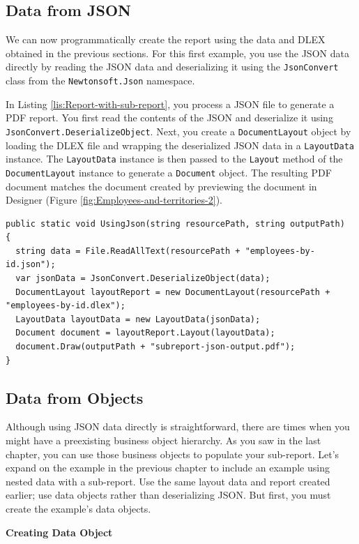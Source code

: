 \documentclass[american,letterpaper]{tufte-book}
\numberwithin{equation}{section}
\numberwithin{figure}{section}
\begin{document}
{{\begin{figure}
\end{figure}


\subsection{Data from JSON}

We can now programmatically create
the report using the data and DLEX obtained in the previous sections. For this first example, you use the JSON
data directly by reading the JSON data and deserializing it using
the \texttt{JsonConvert} class from the \texttt{Newtonsoft.Json} namespace.\cite{newtonsoft}

In Listing \ref{lis:Report-with-sub-report}, you process a JSON file
to generate a PDF report. You first read the contents of the JSON
and deserialize it using \texttt{JsonConvert.DeserializeObject}. Next,
you create a \texttt{DocumentLayout} object by loading the DLEX file
and wrapping the deserialized JSON data in a \texttt{LayoutData} instance.
The \texttt{LayoutData} instance is then passed to the \texttt{Layout}
method of the \texttt{DocumentLayout} instance to generate a \texttt{Document}
object. The resulting PDF document matches the document created by
previewing the document in Designer (Figure \ref{fig:Employees-and-territories-2}).

\bgroup{}
\begin{lstlisting}[caption={Report with sub-report using JSON.},label={lis:Report-with-sub-report},basicstyle={\small\ttfamily},breaklines=true]
public static void UsingJson(string resourcePath, string outputPath)
{
  string data = File.ReadAllText(resourcePath + "employees-by-id.json");
  var jsonData = JsonConvert.DeserializeObject(data);
  DocumentLayout layoutReport = new DocumentLayout(resourcePath + "employees-by-id.dlex");
  LayoutData layoutData = new LayoutData(jsonData);
  Document document = layoutReport.Layout(layoutData);
  document.Draw(outputPath + "subreport-json-output.pdf");
}
\end{lstlisting}
\leavevmode\egroup


\subsection{Data from Objects}

Although using JSON data directly is straightforward, there are times
when you might have a preexisting business object hierarchy. As you
saw in the last chapter, you can use those business objects to populate
your sub-report. Let's expand on the example in the previous chapter to include an example using nested data with a sub-report.
Use the same layout data and report created earlier; use data objects
rather than deserializing JSON. But first, you must create the example's
data objects.
\noindent\begin{flushleft}
\textbf{Creating Data Object}
\par\end{flushleft}

}}
\end{document}
